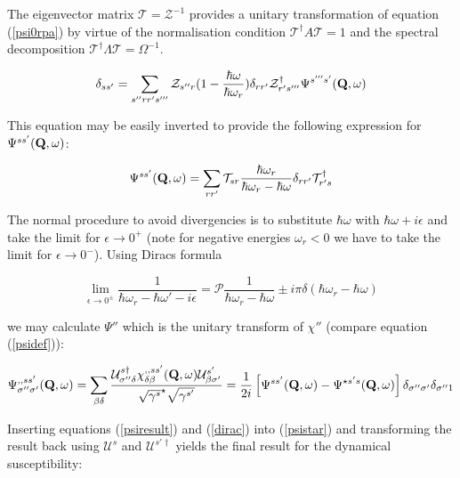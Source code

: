 The eigenvector matrix $\mathcal T=\mathcal Z^{-1}$ provides a unitary transformation 
 of equation (\ref{psi0rpa}) by virtue of the normalisation condition
 $\mathcal T^\dag A\mathcal T=1$
and the spectral decomposition $\mathcal T^\dag \Lambda \mathcal T=\Omega^{-1}$.

\begin{equation}
\delta_{ss'}=\sum_{s''rr's'''} \mathcal Z_{s''r} (1-\frac{\hbar\omega}{\hbar\omega_r})\delta_{rr'}\mathcal Z^\dag_{r's'''}
\Psi^{s'''s'}({\mathbf Q},\omega)
\end{equation}

This equation may be easily inverted to provide the following expression for $\Psi^{ss'}({\mathbf Q},\omega)$:

\begin{equation}\label{psiresult}
\Psi^{ss'}({\mathbf Q},\omega)
=
\sum_{rr'} \mathcal T_{sr} \frac{\hbar \omega_r}{\hbar\omega_r-\hbar\omega}\delta_{rr'}\mathcal T^\dag_{r's}
\end{equation}

The normal procedure to avoid divergencies is to substitute $\hbar \omega$ with $\hbar \omega + i \epsilon$ and
take the limit for $\epsilon \rightarrow 0^+$ (note for negative
energies $\omega_r<0$ we have to take the limit for  $\epsilon \rightarrow 0^-$). Using Diracs formula 

\begin{equation}\label{dirac}
\lim_{\epsilon \rightarrow 0^\pm} \frac{1}{\hbar \omega_r-\hbar \omega' -i\epsilon}=\mathcal P \frac{1}{\hbar\omega_r - %
\hbar \omega} \pm i \pi \delta(\hbar \omega_r -\hbar \omega)
\end{equation}

we may calculate $\Psi''$ which is the unitary transform of $\chi''$ (compare equation (\ref{psidef})):

\begin{equation}\label{psistar}
\Psi^{,,ss'}_{\sigma''\sigma'}({\mbf Q},\omega)=\sum_{\beta\delta} \frac{\mathcal U^{s\dag %
}_{\sigma''\delta}\chi^{,,ss'}_{\delta\beta}(\mbf Q,\omega)\mathcal U^{s'}_{\beta\sigma'}}
{\sqrt{\gamma^s}^\star\sqrt{\gamma^{s'}}}=
\frac{1}{2i}\left[ \Psi^{ss'}(\mbf Q,\omega)-\Psi^{\star s's}(\mbf Q,\omega)\right] \delta_{\sigma''\sigma'} %
\delta_{\sigma''1}
\end{equation}

Inserting equations (\ref{psiresult}) and (\ref{dirac}) into (\ref{psistar}) and transforming the result back using %
$\mathcal U^s$ and $\mathcal U^{s'\dag}$ 
yields the final result for the dynamical susceptibility:

